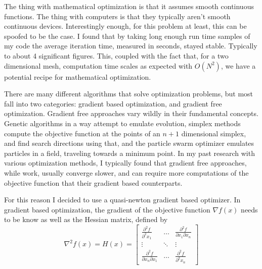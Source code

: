 \documentclass[12pt,parskip=full]{article}
\numberwithin{subsection}{section}
\begin{document}
		The thing with mathematical optimization is that it assumes smooth continuous functions. The thing with computers is that they
		typically aren't smooth continuous devices. Interestingly enough, for this problem at least, this can be spoofed to be the case.
		I found that by taking long enough run time samples of my code the average iteration time, measured in seconds, stayed stable.
		Typically to about 4 significant figures. This, coupled with the fact that, for a two dimensional mesh, computation time scales
		as expected with $O(N^2)$, we have a potential recipe for mathematical optimization. 

		There are many different algorithms that solve optimization problems, but most fall into two categories: gradient based optimization,
		and gradient free optimization. Gradient free approaches vary wildly in their fundamental concepts. Genetic algorithms in a way
		attempt to emulate evolution, simplex methods compute the objective function at the points of an $n + 1$ dimensional simplex, and
		find search directions using that, and the particle swarm optimizer emulates particles in a field, traveling towards a minimum point.
		In my past research with various optimization methods, I typically found that gradient free approaches, while work, usually converge
		slower, and can require more computations of the objective function that their gradient based counterparts.

		For this reason I decided to use a quasi-newton gradient based optimizer. In gradient based optimization, the gradient of the objective
		function $\nabla f(x)$ needs to be know as well as the Hessian matrix, defined by
		\begin{equation}
			\nabla^2 f(x) = H(x) = \begin{bmatrix}
				\frac{\partial^2 f}{\partial^2 x_1} & \dots & \frac{\partial^2 f}{\partial x_1 \partial x_n} \\
				\vdots & \ddots & \vdots \\
				\frac{\partial^2 f}{\partial x_n \partial x_1} & \dots & \frac{\partial^2 f}{\partial^2 x_n}
			\end{bmatrix}
		\end{equation}
\end{document}

